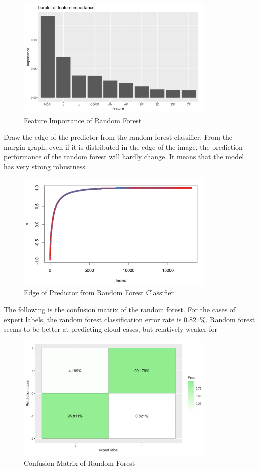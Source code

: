\documentclass[11pt]{article}
\begin{document}
\begin{figure}[H]
  \centering
      \includegraphics[width=0.85\textwidth, height=0.45\textwidth]{../figures/barplot.png}    
  \caption{Feature Importance of Random Forest}
\end{figure}

\newpage
Draw the edge of the predictor from the random forest classifier. From the margin graph, even if it is distributed in the edge of the image, the prediction performance of the random forest will hardly change. It means that the model has very strong robustness.

\begin{figure}[H]
  \centering
      \includegraphics[width=0.85\textwidth, height=0.45\textwidth]{../figures/edge_RF.png}    
  \caption{Edge of Predictor from Random Forest Classifier}
\end{figure}

The following is the confusion matrix of the random forest. For the cases of expert labels, the random forest classification error rate is $0.821\%$. Random forest seems to be better at predicting cloud cases, but relatively weaker for 

\begin{figure}[H]
  \centering
      \includegraphics[width=0.85\textwidth, height=0.45\textwidth]{../figures/matrix.png}    
  \caption{Confusion Matrix of Random Forest}
\end{figure}
\end{document}
